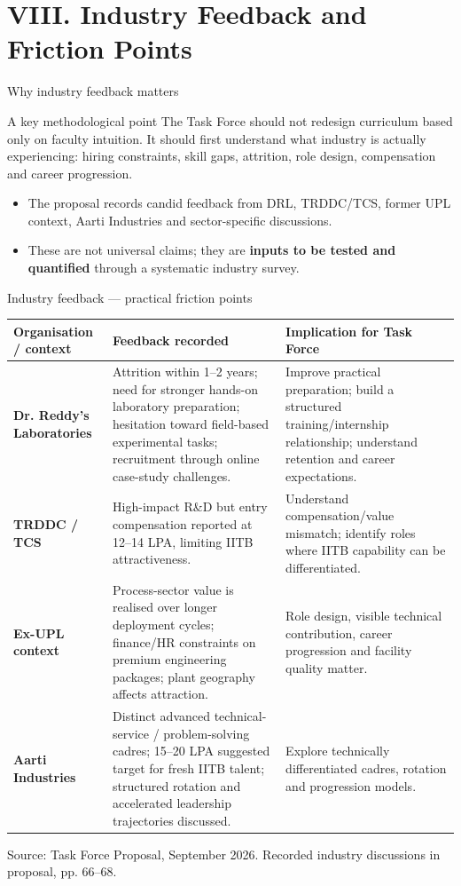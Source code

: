 \documentclass[aspectratio=169,11pt]{beamer}
\newcommand{\key}[1]{\textbf{\color{IITblue}#1}}
\newcommand{\sourcefoot}[1]{\vfill\tiny\color{gray}Source: Task Force Proposal, September 2026. #1}
\begin{document}
\section{VIII. Industry Feedback and Friction Points}
\begin{frame}{Why industry feedback matters}
\begin{block}{A key methodological point}
The Task Force should not redesign curriculum based only on faculty intuition. It should first understand what industry is actually experiencing: hiring constraints, skill gaps, attrition, role design, compensation and career progression.
\end{block}
\begin{itemize}
\item The proposal records candid feedback from DRL, TRDDC/TCS, former UPL context, Aarti Industries and sector-specific discussions.
\item These are not universal claims; they are \key{inputs to be tested and quantified} through a systematic industry survey.
\end{itemize}
\end{frame}

\begin{frame}{Industry feedback — practical friction points}
\scriptsize
\begin{tabularx}{\textwidth}{>{\bfseries}p{2.5cm} X X}
\toprule
Organisation / context & Feedback recorded & Implication for Task Force \\
\midrule
Dr. Reddy's Laboratories & Attrition within 1--2 years; need for stronger hands-on laboratory preparation; hesitation toward field-based experimental tasks; recruitment through online case-study challenges. & Improve practical preparation; build a structured training/internship relationship; understand retention and career expectations. \\
TRDDC / TCS & High-impact R\&D but entry compensation reported at 12--14 LPA, limiting IITB attractiveness. & Understand compensation/value mismatch; identify roles where IITB capability can be differentiated. \\
Ex-UPL context & Process-sector value is realised over longer deployment cycles; finance/HR constraints on premium engineering packages; plant geography affects attraction. & Role design, visible technical contribution, career progression and facility quality matter. \\
Aarti Industries & Distinct advanced technical-service / problem-solving cadres; 15--20 LPA suggested target for fresh IITB talent; structured rotation and accelerated leadership trajectories discussed. & Explore technically differentiated cadres, rotation and progression models. \\
\bottomrule
\end{tabularx}
\sourcefoot{Recorded industry discussions in proposal, pp. 66--68.}
\end{frame}
\end{document}
